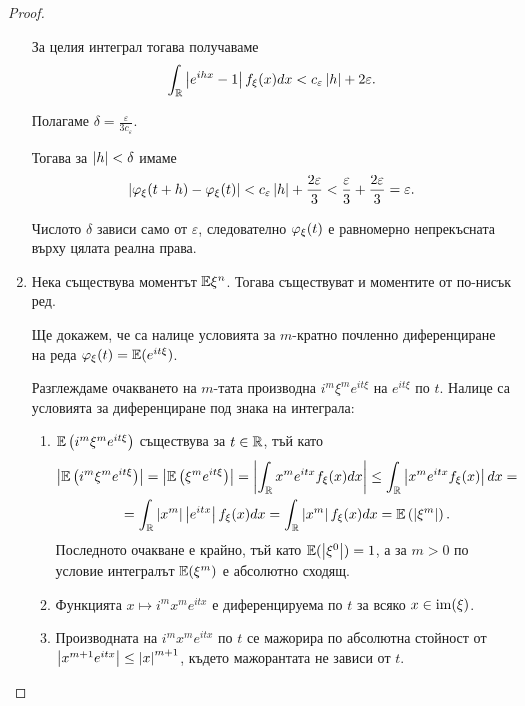 \documentclass[numbers=endperiod, DIV=15, bibliography=totocnumbered]{scrartcl}
\begin{document}
\begin{proof}
\begin{enumerate}
    За целия интеграл тогава получаваме
    \begin{displaymath}
      \int_{\mathbb{R}} \left\vert e^{ihx} - 1 \right\vert f_\xi(x) dx
      <
      c_\varepsilon \left\vert h \right\vert + 2 \varepsilon.
    \end{displaymath}

    Полагаме $\delta = \frac \varepsilon {3 c_\varepsilon}$.

    Тогава за $\left\vert h \right\vert < \delta$ имаме
    \begin{displaymath}
      \left\vert \varphi_\xi(t + h) - \varphi_\xi(t) \right\vert
      <
      c_\varepsilon \left\vert h \right\vert + \frac {2\varepsilon} 3
      <
      \frac {\varepsilon} 3 + \frac {2\varepsilon} 3
      =
      \varepsilon.
    \end{displaymath}

    Числото $\delta$ зависи само от $\varepsilon$, следователно $\varphi_\xi(t)$ е равномерно непрекъсната върху цялата реална права.

    \item Нека съществува моментът $\mathbb{E} \xi^n$. Тогава съществуват и моментите от по-нисък ред.

    Ще докажем, че са налице условията за $m$-кратно почленно диференциране на реда $\varphi_\xi(t) = \mathbb{E} (e^{it \xi})$.

    Разглеждаме очакването на $m$-тата производна $i^m \xi^m e^{it \xi}$ на $e^{it \xi}$ по $t$. Налице са условията за диференциране под знака на интеграла:
    \begin{enumerate}
      \item $\mathbb{E} \left( i^m \xi^m e^{it \xi} \right)$ съществува за $t \in \mathbb{R}$, тъй като
      \begin{multline*}
        \left\vert \mathbb{E} \left( i^m \xi^m e^{it \xi} \right) \right\vert
        =
        \left\vert \mathbb{E} \left( \xi^m e^{it \xi} \right) \right\vert
        =
        \left\vert \int_{\mathbb{R}} x^m e^{itx} f_\xi(x) dx \right\vert
        \leq
        \int_{\mathbb{R}} \left\vert x^m e^{itx} f_\xi(x) \right\vert dx
        = \\ =
        \int_{\mathbb{R}} \left\vert x^m \right\vert \left\vert e^{itx} \right\vert f_\xi(x) dx
        =
        \int_{\mathbb{R}} \left\vert x^m \right\vert f_\xi(x) dx
        =
        \mathbb{E} \left( {\left\vert \xi^m \right\vert} \right).
      \end{multline*}
      Последното очакване е крайно, тъй като $\mathbb{E}(\left\vert \xi^0 \right\vert) = 1$, а за $m > 0$ по условие интегралът $\mathbb{E}(\xi^m)$ е абсолютно сходящ.
      \item Функцията $x \mapsto i^m x^m e^{it x}$ е диференцируема по $t$ за всяко $x \in \operatorname{im}(\xi)$.
      \item Производната на $i^m x^m e^{it x}$ по $t$ се мажорира по абсолютна стойност от $\left\vert x^{m+1} e^{it x} \right\vert \leq {\left\vert x \right\vert}^{m+1}$, където мажорантата не зависи от $t$.
    \end{enumerate}


\end{enumerate}
\end{proof}
\end{document}
